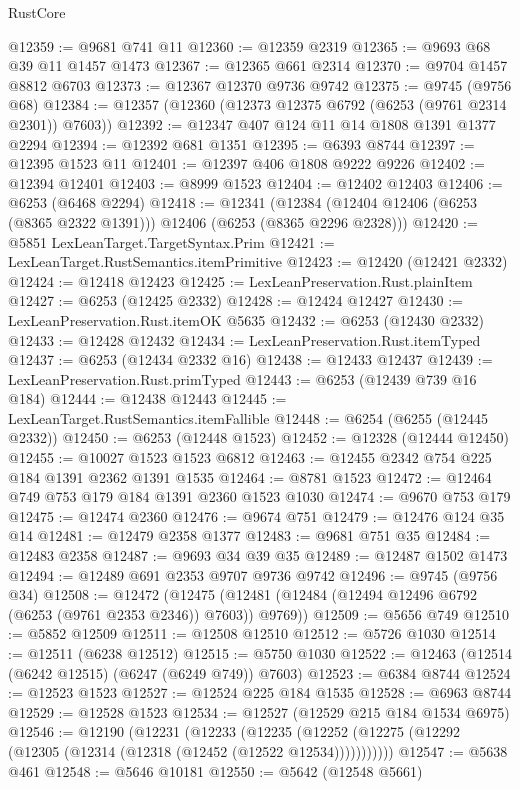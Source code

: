\begin{lexlean}{RustCore}
\begin{coremodule}
@12359 := @9681 @741 @11
@12360 := @12359 @2319
@12365 := @9693 @68 @39 @11 @1457 @1473
@12367 := @12365 @661 @2314
@12370 := @9704 @1457 @8812 @6703
@12373 := @12367 @12370 @9736 @9742
@12375 := @9745 (@9756 @68)
@12384 := @12357 (@12360 (@12373 @12375 @6792 (@6253 (@9761 @2314 @2301)) @7603))
@12392 := @12347 @407 @124 @11 @14 @1808 @1391 @1377 @2294
@12394 := @12392 @681 @1351
@12395 := @6393 @8744
@12397 := @12395 @1523 @11
@12401 := @12397 @406 @1808 @9222 @9226
@12402 := @12394 @12401
@12403 := @8999 @1523
@12404 := @12402 @12403
@12406 := @6253 (@6468 @2294)
@12418 := @12341
    (@12384 (@12404 @12406 (@6253 (@8365 @2322 @1391))) @12406 (@6253 (@8365 @2296 @2328)))
@12420 := @5851 LexLeanTarget.TargetSyntax.Prim
@12421 := LexLeanTarget.RustSemantics.itemPrimitive
@12423 := @12420 (@12421 @2332)
@12424 := @12418 @12423
@12425 := LexLeanPreservation.Rust.plainItem
@12427 := @6253 (@12425 @2332)
@12428 := @12424 @12427
@12430 := LexLeanPreservation.Rust.itemOK @5635
@12432 := @6253 (@12430 @2332)
@12433 := @12428 @12432
@12434 := LexLeanPreservation.Rust.itemTyped
@12437 := @6253 (@12434 @2332 @16)
@12438 := @12433 @12437
@12439 := LexLeanPreservation.Rust.primTyped
@12443 := @6253 (@12439 @739 @16 @184)
@12444 := @12438 @12443
@12445 := LexLeanTarget.RustSemantics.itemFallible
@12448 := @6254 (@6255 (@12445 @2332))
@12450 := @6253 (@12448 @1523)
@12452 := @12328 (@12444 @12450)
@12455 := @10027 @1523 @1523 @6812
@12463 := @12455 @2342 @754 @225 @184 @1391 @2362 @1391 @1535
@12464 := @8781 @1523
@12472 := @12464 @749 @753 @179 @184 @1391 @2360 @1523 @1030
@12474 := @9670 @753 @179
@12475 := @12474 @2360
@12476 := @9674 @751
@12479 := @12476 @124 @35 @14
@12481 := @12479 @2358 @1377
@12483 := @9681 @751 @35
@12484 := @12483 @2358
@12487 := @9693 @34 @39 @35
@12489 := @12487 @1502 @1473
@12494 := @12489 @691 @2353 @9707 @9736 @9742
@12496 := @9745 (@9756 @34)
@12508 := @12472
    (@12475 (@12481 (@12484 (@12494 @12496 @6792 (@6253 (@9761 @2353 @2346)) @7603)) @9769))
@12509 := @5656 @749
@12510 := @5852 @12509
@12511 := @12508 @12510
@12512 := @5726 @1030
@12514 := @12511 (@6238 @12512)
@12515 := @5750 @1030
@12522 := @12463 (@12514 (@6242 @12515) (@6247 (@6249 @749)) @7603)
@12523 := @6384 @8744
@12524 := @12523 @1523
@12527 := @12524 @225 @184 @1535
@12528 := @6963 @8744
@12529 := @12528 @1523
@12534 := @12527 (@12529 @215 @184 @1534 @6975)
@12546 := @12190
    (@12231
      (@12233
        (@12235 (@12252 (@12275 (@12292 (@12305 (@12314 (@12318 (@12452 (@12522 @12534)))))))))))
@12547 := @5638 @461
@12548 := @5646 @10181
@12550 := @5642 (@12548 @5661)

\end{coremodule}
\end{lexlean}
